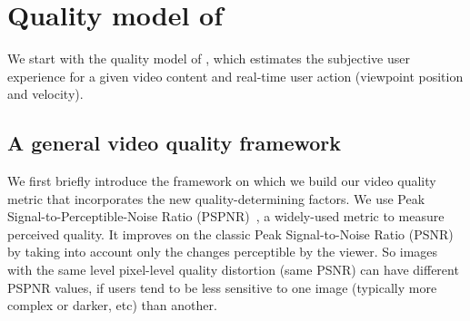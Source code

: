
\section{Quality model of \name}
\label{sec:jnd}

We start with the quality model of \name, which estimates the subjective user experience for a given video content and real-time user action (viewpoint position and velocity).

\subsection{A general video quality framework}
\label{subsec:jnd:framework}


%

We first briefly introduce the framework on which we build our video quality metric that incorporates the new quality-determining factors. 
We use Peak Signal-to-Perceptible-Noise Ratio (PSPNR)~\cite{PSPNR}, a widely-used metric to measure perceived quality. 
It improves on the classic Peak Signal-to-Noise Ratio (PSNR) by taking into account only the changes perceptible by the viewer.
So images with the same level pixel-level quality distortion (\ie same PSNR) can have different PSPNR values, if users tend to be less sensitive to one image (\eg typically more complex or darker, etc) than another.

